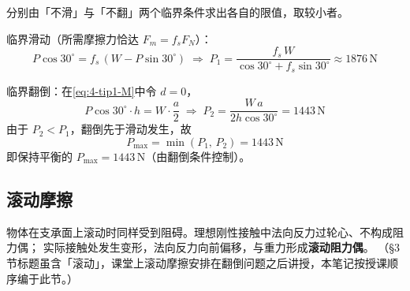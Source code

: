 \begin{longexample}
\begin{solution}

分别由「不滑」与「不翻」两个临界条件求出各自的限值，取较小者。

临界滑动（所需摩擦力恰达 $F_m = f_s F_N$）：
\begin{equation}\label{eq:4-tip2-slide}
  P\cos 30^{\circ} = f_s\,(W - P\sin 30^{\circ})
  \;\Rightarrow\;
  P_1 = \frac{f_s\,W}{\cos 30^{\circ} + f_s\sin 30^{\circ}}
      \approx 1876\,\mathrm{N}
\end{equation}

临界翻倒：在\eqref{eq:4-tip1-M}中令 $d = 0$，
\begin{equation}\label{eq:4-tip2-tip}
  P\cos 30^{\circ}\cdot h = W\cdot\frac{a}{2}
  \;\Rightarrow\;
  P_2 = \frac{W\,a}{2h\cos 30^{\circ}} = 1443\,\mathrm{N}
\end{equation}
由于 $P_2 < P_1$，翻倒先于滑动发生，故
\begin{equation}\label{eq:4-tip2-Pmax}
  P_{\max} = \min(P_1,\,P_2) = 1443\,\mathrm{N}
\end{equation}
即保持平衡的 $P_{\max} = 1443\,\mathrm{N}$（由翻倒条件控制）。
\end{solution}
\end{longexample}

\subsection{滚动摩擦}

物体在支承面上滚动时同样受到阻碍。理想刚性接触中法向反力过轮心、不构成阻力偶；
实际接触处发生变形，法向反力向前偏移，与重力形成\textbf{滚动阻力偶}。
（§3 节标题虽含「滚动」，课堂上滚动摩擦安排在翻倒问题之后讲授，本笔记按授课顺序编于此节。）

